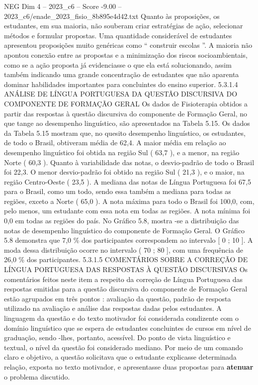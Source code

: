 \begin{textsample}{NEG Dim 4 – 2023\_c6 – Score -9.00 – 2023\_c6/enade\_2023\_fisio\_8b895e4d42.txt}
Quanto às proposições, os estudantes, em sua maioria, não souberam criar estratégias de ação, selecionar métodos e formular propostas.
Uma quantidade considerável de estudantes apresentou proposições muito genéricas como “ construir escolas ”.
A maioria não apontou conexão entre as propostas e a minimização dos riscos socioambientais, como se a ação proposta já evidenciasse o que ela está solucionando, assim também indicando uma grande concentração de estudantes que não aparenta dominar habilidades importantes para concluintes do ensino superior. 5.3.1.4 ANÁLISE DE LÍNGUA PORTUGUESA DA QUESTÃO DISCURSIVA DO COMPONENTE DE FORMAÇÃO GERAL Os dados de Fisioterapia obtidos a partir das respostas à questão discursiva do componente de Formação Geral, no que tange ao desempenho linguístico, são apresentados na Tabela 5.15.
Os dados da Tabela 5.15 mostram que, no quesito desempenho linguístico, os estudantes, de todo o Brasil, obtiveram média de 62,4.
A maior média em relação ao desempenho linguístico foi obtida na região Sul ( 63,7 ), e a menor, na região Norte ( 60,3 ).
Quanto à variabilidade das notas, o desvio-padrão de todo o Brasil foi 22,3.
O menor desvio-padrão foi obtido na região Sul ( 21,3 ), e o maior, na região Centro-Oeste ( 23,5 ).
A mediana das notas de Língua Portuguesa foi 67,5 para o Brasil, como um todo, sendo essa também a mediana para todas as regiões, exceto a Norte ( 65,0 ).
A nota máxima para todo o Brasil foi 100,0, com, pelo menos, um estudante com essa nota em todas as regiões.
A nota mínima foi 0,0 em todas as regiões do país.
No Gráfico 5.8, mostra -se a distribuição das notas de desempenho linguístico do componente de Formação Geral.
O Gráfico 5.8 demonstra que 7,0 \% dos participantes correspondem ao intervalo [ 0 ; 10 ].
A moda dessa distribuição ocorre no intervalo ( 70 ; 80 ], com uma frequência de 26,0 \% dos participantes. 5.3.1.5 COMENTÁRIOS SOBRE A CORREÇÃO DE LÍNGUA PORTUGUESA DAS RESPOSTAS À QUESTÃO DISCURSIVAS Os comentários feitos neste item a respeito da correção de Língua Portuguesa das respostas emitidas para a questão discursiva do componente de Formação Geral estão agrupados em três pontos : avaliação da questão, padrão de resposta utilizado na avaliação e análise das respostas dadas pelos estudantes.
A linguagem da questão e do texto motivador foi considerada condizente com o domínio linguístico que se espera de estudantes concluintes de cursos em nível de graduação, sendo -lhes, portanto, acessível.
Do ponto de vista linguístico e textual, o nível da questão foi considerado mediano.
Por meio de um comando claro e objetivo, a questão solicitava que o estudante explicasse determinada relação, exposta no texto motivador, e apresentasse duas propostas para \textbf{atenuar} o problema discutido.

\end{textsample}
